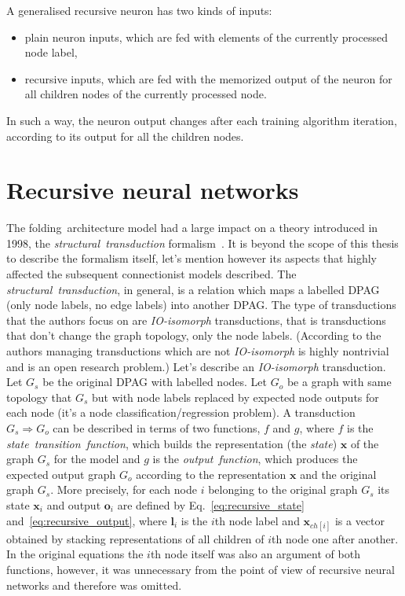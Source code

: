 \noindent A generalised recursive neuron has two kinds of inputs:
\begin{itemize}
\item plain neuron inputs, which are fed with elements of the currently processed node label,
\item recursive inputs, which are fed with the memorized output of the neuron for all children nodes of the currently processed node.
\end{itemize}

\noindent In such a way, the neuron output changes after each training algorithm iteration, according to its output for all the children nodes.

\section{Recursive neural networks}
The folding~architecture model had a large impact on a theory introduced in 1998, the \emph{structural~transduction} formalism~\cite{frasconi1998general}. It is beyond the scope of this thesis to describe the formalism itself, let's mention however its aspects that highly affected the subsequent connectionist models described. The \emph{structural~transduction}, in general, is a relation which maps a labelled DPAG (only node labels, no edge labels) into another DPAG. The type of transductions that the authors focus on are \emph{IO-isomorph} transductions, that is transductions that don't change the graph topology, only the node labels. (According to the authors managing transductions which are not \emph{IO-isomorph} is highly nontrivial and is an open research problem.) Let's describe an \emph{IO-isomorph} transduction. Let $G_s$ be the original DPAG with labelled nodes. Let $G_o$ be a graph with same topology that $G_s$ but with node labels replaced by expected node outputs for each node (it's a node classification/regression problem). A transduction $G_s \Rightarrow G_o$ can be described in terms of two functions, $f$ and $g$, where $f$ is the \emph{state~transition~function}, which builds the representation (the \emph{state}) $\bm{x}$ of the graph $G_s$ for the model and $g$ is the \emph{output~function}, which produces the expected output graph $G_o$ according to the representation $\bm{x}$ and the original graph $G_s$. More precisely, for each node $i$ belonging to the original graph $G_s$ its state $\bm{x}_i$ and output ${\bm{o}}_i$ are defined by Eq.~\ref{eq:recursive_state} and~\ref{eq:recursive_output}, where $\bm{l}_i$ is the $i$th node label and $\bm{x}_{ch[i]}$ is a vector obtained by stacking representations of all children of $i$th node one after another. In the original equations the $i$th node itself was also an argument of both functions, however, it was unnecessary from the point of view of recursive neural networks and therefore was omitted. 

